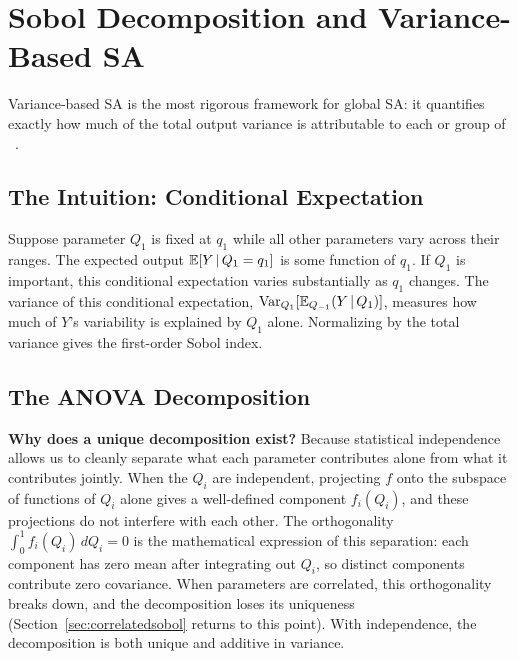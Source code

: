 \section{Sobol Decomposition and Variance-Based SA}
\label{sec:sobol}

Variance-based SA is the most rigorous framework for global SA:
it quantifies exactly how much of the total output variance is
attributable to each \POI or group of \POIs~\cite{sobol2001global}.

\subsection{The Intuition: Conditional Expectation}

Suppose parameter $Q_1$ is fixed at $q_1$ while all other parameters
vary across their ranges. The expected output $\mathbb{E}[Y\,|\,Q_1 = q_1]$
is some function of $q_1$. If $Q_1$ is important, this conditional
expectation varies substantially as $q_1$ changes.
The variance of this conditional expectation,
$\operatorname{Var}_{Q_1}[\mathbb{E}_{Q_{-1}}(Y\,|\,Q_1)]$, measures how much of $Y$'s
variability is explained by $Q_1$ alone. Normalizing by the total
variance gives the first-order Sobol index.

\subsection{The ANOVA Decomposition}

\textbf{Why does a unique decomposition exist?}
Because statistical independence allows us to cleanly separate
what each parameter contributes alone from what it contributes jointly.
When the $Q_i$ are independent, projecting $f$ onto the subspace
of functions of $Q_i$ alone gives a well-defined component $f_i(Q_i)$,
and these projections do not interfere with each other.
The orthogonality $\int_0^1 f_i(Q_i)\,dQ_i = 0$ is the mathematical
expression of this separation: each component has zero mean after
integrating out $Q_i$, so distinct components contribute zero covariance.
When parameters are correlated, this orthogonality breaks down,
and the decomposition loses its uniqueness
(Section~\ref{sec:correlatedsobol} returns to this point).
With independence, the decomposition is both unique and additive in variance.

